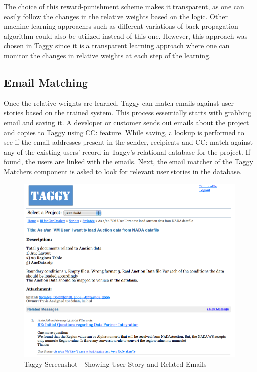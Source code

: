 The choice of this reward-punishment scheme makes it transparent, as one can easily follow the changes in the relative weights based on the logic. Other machine learning approaches such as different variations of back propagation algorithm could also be utilized instead of this one. However, this approach was chosen in Taggy since it is a transparent learning approach where one can monitor the changes in relative weights at each step of the learning.

\subsection{Email Matching}
Once the relative weights are learned, Taggy can match emails against user stories based on the trained system. This process essentially starts with grabbing email and saving it. A developer or customer sends out emails about the project and copies to Taggy using CC: feature. While saving, a lookup is performed to see if the email addresses present in the sender, recipients and CC: match against any of the existing users' record in Taggy's relational database for the project. If found, the users are linked with the emails. Next, the email matcher of the Taggy Matchers component is asked to look for relevant user stories in the database.

\begin{figure}[tb]
	\centering
	\includegraphics[width=\textwidth]{taggy_user_story.png}
    \caption{Taggy Screenshot - Showing User Story and Related Emails}
	\label{fig:taggy_user_story}
\end{figure}

